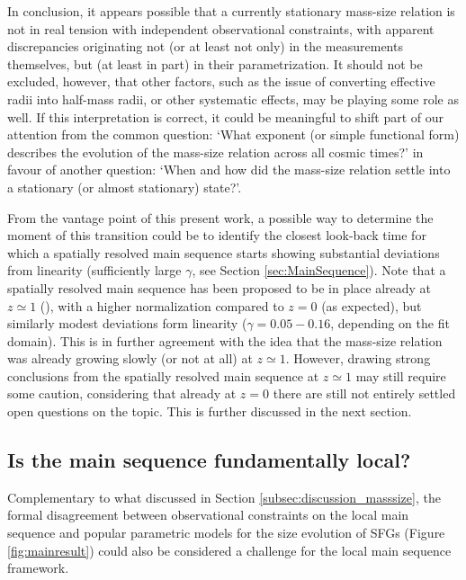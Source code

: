 \documentclass[fleqn,usenatbib]{mnras}
\begin{document}
In conclusion, it appears possible that a currently stationary mass-size relation is not in real tension with independent observational constraints, with apparent discrepancies originating not (or at least not only) in the measurements themselves, but (at least in part) in their parametrization. It should not be excluded, however, that other factors, such as the issue of converting effective radii into half-mass radii, or other systematic effects, may be playing some role as well. If this interpretation is correct, it could be meaningful to shift part of our attention from the common question: `What exponent (or simple functional form) describes the evolution of the mass-size relation across all cosmic times?' in favour of another question: `When and how did the mass-size relation settle into a stationary (or almost stationary) state?'.

From the vantage point of this present work, a possible way to determine the moment of this transition could be to identify the closest look-back time for which a spatially resolved main sequence starts showing substantial deviations from linearity (sufficiently large $\gamma$, see Section \ref{sec:MainSequence}). Note that a spatially resolved main sequence has been proposed to be in place already at $z \simeq 1$ (\citealt{Wuyts+13}), with a higher normalization compared to $z=0$ (as expected), but similarly modest deviations form linearity ($\gamma = 0.05-0.16$, depending on the fit domain). This is in further agreement with the idea that the mass-size relation was already growing slowly (or not at all) at $z\simeq1$. However, drawing strong conclusions from the spatially resolved main sequence at $z\simeq1$ may still require some caution, considering that already at $z=0$ there are still not entirely settled open questions on the topic. This is further discussed in the next section.


\subsection{Is the main sequence fundamentally local?}\label{subsec:discussion_mainsequence}

Complementary to what discussed in Section \ref{subsec:discussion_masssize}, the formal disagreement between observational constraints on the local main sequence and popular parametric models for the size evolution of SFGs (Figure \ref{fig:mainresult}) could also be considered a challenge for the local main sequence framework.
\end{document}

